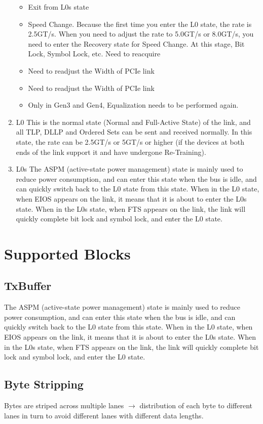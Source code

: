 \begin{enumerate}
\begin{itemize}
    \item  Exit from L0s state
    \item Speed Change. Because the first time you enter the L0 state, the rate is 2.5GT/s. When you need to adjust the rate to 5.0GT/s or 8.0GT/s, you need to enter the Recovery state for Speed Change. At this stage, Bit Lock, Symbol Lock, etc. Need to reacquire
    \item Need to readjust the Width of PCIe link
    \item Need to readjust the Width of PCIe link
    \item Only in Gen3 and Gen4, Equalization needs to be performed again.
\end{itemize}
    \item L0 \newline 
    This is the normal state (Normal and Full-Active State) of the link, and all TLP, DLLP and Ordered Sets can be sent and received normally. In this state, the rate can be 2.5GT/s or 5GT/s or higher (if the devices at both ends of the link support it and have undergone Re-Training).
    \item L0s \newline 
The ASPM (active-state power management) state is mainly used to reduce power consumption, and can enter this state when the bus is idle, and can quickly switch back to the L0 state from this state. When in the L0 state, when EIOS appears on the link, it means that it is about to enter the L0s state. When in the L0s state, when FTS appears on the link, the link will quickly complete bit lock and symbol lock, and enter the L0 state.
\end{enumerate}
\section{Supported Blocks}
\subsection{TxBuffer}
The ASPM (active-state power management) state is mainly used to reduce power consumption, and can enter this state when the bus is idle, and can quickly switch back to the L0 state from this state. When in the L0 state, when EIOS appears on the link, it means that it is about to enter the L0s state. When in the L0s state, when FTS appears on the link, the link will quickly complete bit lock and symbol lock, and enter the L0 state.
\subsection{Byte Stripping}
Bytes are striped across multiple lanes $\longrightarrow$ distribution of each byte to different lanes in turn to avoid different lanes with different data lengths.
  
